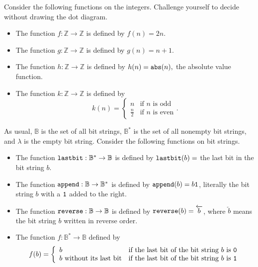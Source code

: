 \begin{act}
\begin{apart}
            \item Consider the following functions on the integers.  Challenge yourself to decide without drawing the dot diagram.
                \begin{itemize}
                    \item The function $f: \mathbb{Z} \to \mathbb{Z}$ is defined by $f(n) = 2n$.  
                    \item The function $g: \mathbb{Z} \to \mathbb{Z}$ is defined by $g(n) = n+1$.  
                    \item The function $h: \mathbb{Z} \to \mathbb{Z}$ is defined by $h(n) = \texttt{abs}(n),$ the absolute value function. 
                    \item The function $k: \mathbb{Z} \to \mathbb{Z}$ is defined by 
                        $$k(n) = \left\{\begin{array}{cl} 
                        n & \text{if }n\text{ is odd} \\
                        \frac{n}{2} & \text{if }n\text{ is even} \end{array}\right..$$ 
            \end{itemize}

            \item As usual, $\mathbb{B}$ is the set of all bit strings, $\mathbb{B}^*$ is the set of all nonempty bit strings, and $\lambda$ is the empty bit string. Consider the following functions on bit strings.   
                \begin{itemize}
                    \item The function $\texttt{lastbit}:\mathbb{B}^* \to \mathbb{B}$ is defined by $\texttt{lastbit}(b) =$ the last bit in the bit string $b$. 
                    \item The function $\texttt{append}:\mathbb{B}\to \mathbb{B}^* $ is defined by $\texttt{append}(b)=b\texttt{1}$, literally the bit string $b$ with a $\texttt{1}$ added to the right.
                    \item The function $\texttt{reverse}:\mathbb{B}\to \mathbb{B}$ is defined by $\texttt{reverse}(b)=\overleftarrow{b}$, where $\overleftarrow{b}$ means the bit string $b$ written in reverse order. 
                    \item The function $f:\mathbb{B}^*\to \mathbb{B}$ defined by $$f(b)= \left\{ \begin{array} {ll} b & \text{if the last bit of the bit string } b \text{ is } \texttt{0} \\ b \text{ without its last  bit}  & \text{if the last bit of the bit string } b \text{ is } \texttt{1} \\  \end{array} \right.$$ 
                \end{itemize}
        \end{apart}
\end{act}


